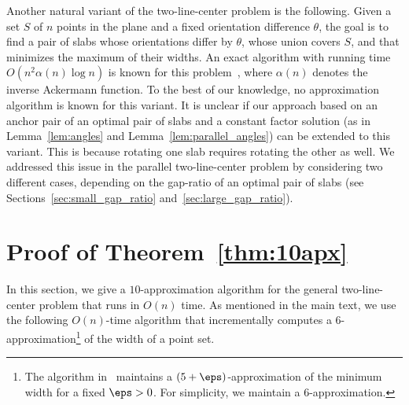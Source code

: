 Another natural variant of the two-line-center problem is the following. Given a set $S$ of $n$ points in the plane and a fixed orientation difference $\theta$, the goal is to find a pair of slabs whose orientations differ by $\theta$, whose union covers $S$, and that minimizes the maximum of their widths. 
An exact algorithm with running time $O(n^2 \alpha(n)\log n)$ is known for this problem~\cite{ahn2024constrained}, where $\alpha(n)$ denotes the inverse Ackermann function. 
To the best of our knowledge, no approximation algorithm is known for this variant.
It is unclear if our approach based on an anchor pair of an optimal pair of slabs and a constant factor solution (as in Lemma~\ref{lem:angles} and Lemma~\ref{lem:parallel_angles}) can be extended to this variant.
This is because rotating one slab requires rotating the other as well. We addressed this issue in the parallel two-line-center problem by considering two different cases, depending on the gap-ratio of an optimal pair of slabs (see Sections~\ref{sec:small_gap_ratio} and~\ref{sec:large_gap_ratio}).

















\appendix



\section{Proof of Theorem~\ref{thm:10apx}}
\label{sec:linear_10apx}

In this section, we give a $10$-approximation algorithm for the general two-line-center problem that runs in $O(n)$ time. 
As mentioned in the main text, we use the following $O(n)$-time algorithm that incrementally computes a $6$-approximation\footnote{The algorithm in~\cite{chan2006faster} maintains a $(5+\eps)$-approximation of the minimum width for a fixed $\eps>0$. For simplicity, we maintain a $6$-approximation.} of the width of a point set.

